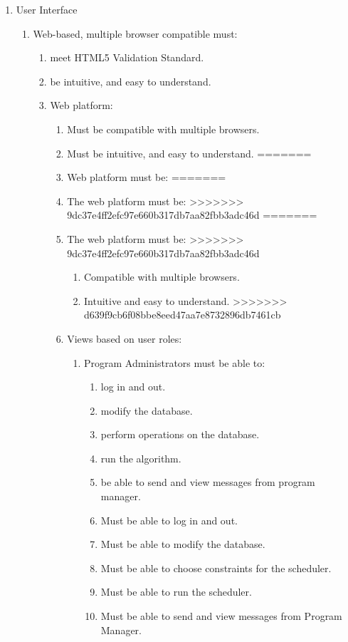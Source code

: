 \documentclass[12pt]{article}
\begin{document}
\begin{enumerate}
\item User Interface
	\begin{enumerate}
<<<<<<< HEAD
<<<<<<< HEAD
<<<<<<< HEAD
	\item Web-based, multiple browser compatible must:
		\begin{enumerate}
		\item meet HTML5 Validation Standard.
		\item be intuitive, and easy to understand.
	\item Web platform:
		\begin{enumerate}
		\item Must be compatible with multiple browsers.
		\item Must be intuitive, and easy to understand.
=======
	\item Web platform must be:
=======
	\item The web platform must be:
>>>>>>> 9dc37e4ff2efc97e660b317db7aa82fbb3adc46d
=======
	\item The web platform must be:
>>>>>>> 9dc37e4ff2efc97e660b317db7aa82fbb3adc46d
		\begin{enumerate}
		\item Compatible with multiple browsers.
		\item	Intuitive and easy to understand.
>>>>>>> d639f9cb6f08bbe8eed47aa7e8732896db7461cb
		\end{enumerate}
	\item Views based on user roles:
		\begin{enumerate}
		\item Program Administrators must be able to:
			\begin{enumerate}
<<<<<<< HEAD

		    \item log in and out.
		    \item modify the database.
		    \item perform operations on the database.
		    \item run the algorithm.
		    \item be able to send and view messages from program manager.

		    \item Must be able to log in and out.
		    \item Must be able to modify the database.
		    \item Must be able to choose constraints for the scheduler.
		    \item Must be able to run the scheduler.
		    \item Must be able to send and view messages from Program Manager.


\end{enumerate}
\end{enumerate}
\end{enumerate}
\end{enumerate}
\end{enumerate}
\end{enumerate}
\end{document}
